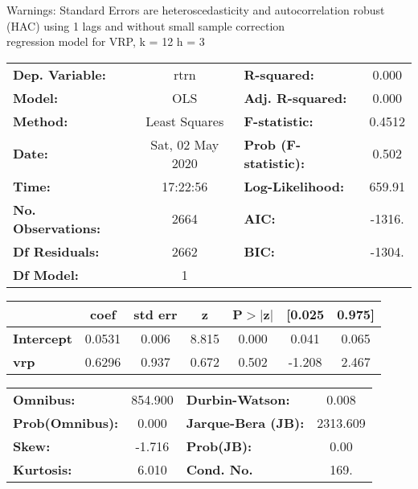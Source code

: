 Warnings: \newline
 [1] Standard Errors are heteroscedasticity and autocorrelation robust (HAC) using 1 lags and without small sample correction\\ 

regression model for VRP, k = 12 h = 3\begin{center}
\begin{tabular}{lclc}
\toprule
\textbf{Dep. Variable:}    &       rtrn       & \textbf{  R-squared:         } &     0.000   \\
\textbf{Model:}            &       OLS        & \textbf{  Adj. R-squared:    } &     0.000   \\
\textbf{Method:}           &  Least Squares   & \textbf{  F-statistic:       } &    0.4512   \\
\textbf{Date:}             & Sat, 02 May 2020 & \textbf{  Prob (F-statistic):} &    0.502    \\
\textbf{Time:}             &     17:22:56     & \textbf{  Log-Likelihood:    } &    659.91   \\
\textbf{No. Observations:} &        2664      & \textbf{  AIC:               } &    -1316.   \\
\textbf{Df Residuals:}     &        2662      & \textbf{  BIC:               } &    -1304.   \\
\textbf{Df Model:}         &           1      & \textbf{                     } &             \\
\bottomrule
\end{tabular}
\begin{tabular}{lcccccc}
                   & \textbf{coef} & \textbf{std err} & \textbf{z} & \textbf{P$> |$z$|$} & \textbf{[0.025} & \textbf{0.975]}  \\
\midrule
\textbf{Intercept} &       0.0531  &        0.006     &     8.815  &         0.000        &        0.041    &        0.065     \\
\textbf{vrp}       &       0.6296  &        0.937     &     0.672  &         0.502        &       -1.208    &        2.467     \\
\bottomrule
\end{tabular}
\begin{tabular}{lclc}
\textbf{Omnibus:}       & 854.900 & \textbf{  Durbin-Watson:     } &    0.008  \\
\textbf{Prob(Omnibus):} &   0.000 & \textbf{  Jarque-Bera (JB):  } & 2313.609  \\
\textbf{Skew:}          &  -1.716 & \textbf{  Prob(JB):          } &     0.00  \\
\textbf{Kurtosis:}      &   6.010 & \textbf{  Cond. No.          } &     169.  \\
\bottomrule
\end{tabular}
\end{center}

